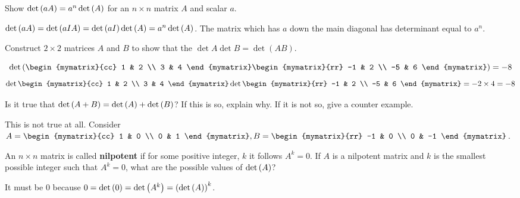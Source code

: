 \begin{enumialphparenastyle}
\begin{ex} Show $\det \left(aA\right) =a^{n}\det \left(A\right) $ for an $n \times n $ matrix $A
$ and scalar $a$. 
\begin{sol}
$\det \left(aA\right) =\det
\left(aIA\right) =\det \left(aI\right) \det \left(A\right) =a^{n}\det
\left(A\right)$. The matrix which has $a$ down the main diagonal has
determinant equal to $a^{n}$.
\end{sol}
\end{ex}


\begin{ex} Construct $2\times 2$ matrices $A$ and $B$ to show that the
$\det A \det B = \det (AB)$. 
\begin{sol}
\[
\det
\tup{\begin{mymatrix}{cc}
1 & 2 \\
3 & 4
\end{mymatrix} \begin{mymatrix}{rr}
-1 & 2 \\
-5 & 6
\end{mymatrix} } = -8
\]
\[
\det \begin{mymatrix}{cc}
1 & 2 \\
3 & 4
\end{mymatrix} \det \begin{mymatrix}{rr}
-1 & 2 \\
-5 & 6
\end{mymatrix} = -2 \times 4 = -8
\]
\end{sol}
\end{ex}

\begin{ex} Is it true that $\det \left(A+B\right) =\det \left(A\right) +\det
\left(B\right)$? If this is so, explain why. If it is not so,
give a counter example.  
\begin{sol}
This is not true at all. Consider $A=\begin{mymatrix}{cc}
1 & 0 \\
0 & 1
\end{mymatrix} ,B=\begin{mymatrix}{rr}
-1 & 0 \\
0 & -1
\end{mymatrix} $.
\end{sol}
\end{ex}

\begin{ex} An $n\times n$ matrix is called \textbf{nilpotent}
 if for some positive integer, $k$ it follows $A^{k}=0$. If
$A$ is a nilpotent matrix and $k$ is the smallest possible integer such that
$A^{k}=0$, what are the possible values of $\det \left(A\right)$? 
\begin{sol}
It must
be 0 because $0=\det \left(0\right) =\det \left(A^{k}\right) =\left(\det
\left(A\right) \right) ^{k}$.
\end{sol}
\end{ex}


\end{enumialphparenastyle}
